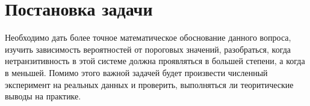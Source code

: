 \section{Постановка задачи}
Необходимо дать более точное математическое обоснование данного вопроса, изучить зависимость вероятностей от пороговых значений, разобраться, когда нетранзитивность в этой системе должна проявляться в большей степени, а когда в меньшей. Помимо этого важной задачей будет произвести численный эксперимент на реальных данных и проверить, выполняться ли теоритические выводы на практике.

